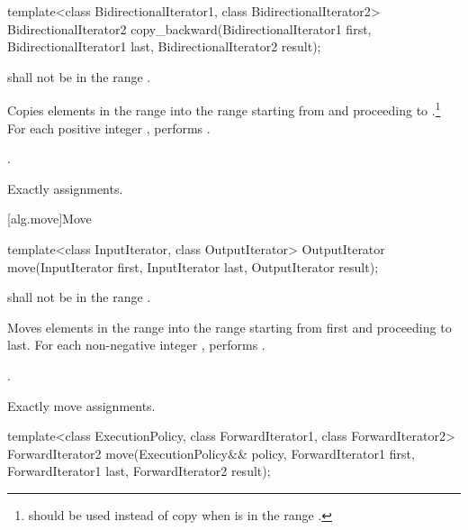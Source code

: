%
\begin{itemdecl}
template<class BidirectionalIterator1, class BidirectionalIterator2>
  BidirectionalIterator2
    copy_backward(BidirectionalIterator1 first,
                  BidirectionalIterator1 last,
                  BidirectionalIterator2 result);
\end{itemdecl}

\begin{itemdescr}
\pnum
\requires
{}
shall not be in the range
.

\pnum
\effects
Copies elements in the range 
into the
range 
starting from
and proceeding to .\footnote{
should be used instead of copy when 
is in
the range
.}
For each positive integer
,
performs
.

\pnum
\returns
{}.

\pnum
\complexity
Exactly
assignments.
\end{itemdescr}

[alg.move]{Move}

%
\begin{itemdecl}
template<class InputIterator, class OutputIterator>
  OutputIterator move(InputIterator first, InputIterator last, OutputIterator result);
\end{itemdecl}

\begin{itemdescr}
\pnum
\requires
{}
shall not be in the range
.

\pnum
\effects
Moves elements in the range 
into the range 
starting from first and proceeding to last.
For each non-negative integer
,
performs
 .

\pnum
\returns
{}.

\pnum
\complexity
Exactly
move assignments.
\end{itemdescr}

%
\begin{itemdecl}
template<class ExecutionPolicy, class ForwardIterator1, class ForwardIterator2>
  ForwardIterator2 move(ExecutionPolicy&& policy,
                        ForwardIterator1 first, ForwardIterator1 last,
                        ForwardIterator2 result);
\end{itemdecl}

